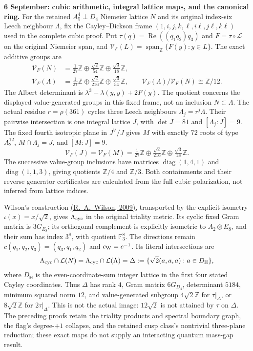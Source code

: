 \documentclass[10pt,letterpaper]{article}
\begin{document}
\noindent\textbf{6 September: cubic arithmetic, integral lattice maps, and the canonical ring.}
For the retained $A_5^4\perp D_4$ Niemeier lattice $N$ and its
original index-six Leech neighbour $\Lambda$, fix the Cayley--Dickson
frame $(1,i,j,k,\ell,i\ell,j\ell,k\ell)$ used in the complete cubic
proof. Put $\tau(q)=\operatorname{Re}((q_1q_2)q_3)$ and
$F=\tau\circ\mathcal L$ on the original Niemeier span,
and $\mathcal V_F(L)=\operatorname{span}_{\mathbb Z}\{F(y):y\in L\}$.
The exact additive groups are
\[
\begin{aligned}
 \mathcal V_F(N)&=\tfrac1{27}\mathbb Z\oplus
       \tfrac{\sqrt2}{54}\mathbb Z\oplus\tfrac{\sqrt3}{18}\mathbb Z,\\
 \mathcal V_F(\Lambda)&=\tfrac1{27}\mathbb Z\oplus
       \tfrac{\sqrt2}{216}\mathbb Z\oplus\tfrac{\sqrt3}{54}\mathbb Z,
 \qquad \mathcal V_F(\Lambda)/\mathcal V_F(N)\cong\mathbb Z/12.
\end{aligned}
\]
The Albert determinant is $\lambda^3-\lambda(y,y)+2F(y)$.
The quotient concerns the displayed value-generated groups in this fixed
frame, not an inclusion $N\subset\Lambda$. The actual residue
$r=\rho(361)$ cycles three Leech neighbours $\Lambda_j=r^j\Lambda$.
Their pairwise intersection is one integral lattice $J$, with
$\det J=81$ and $[\Lambda_j:J]=9$. The fixed fourth isotropic plane
in $J^\vee/J$ gives $M$ with exactly $72$ roots of type $A_2^{12}$,
$M\cap\Lambda_j=J$, and $[M:J]=9$.
\[
 \mathcal V_F(J)=\mathcal V_F(M)
 =\tfrac1{27}\mathbb Z\oplus\tfrac{\sqrt2}{216}\mathbb Z
                         \oplus\tfrac{\sqrt3}{18}\mathbb Z.
\]
The successive value-group inclusions have matrices
$\operatorname{diag}(1,4,1)$ and $\operatorname{diag}(1,1,3)$,
giving quotients $\mathbb Z/4$ and $\mathbb Z/3$.
Both containments and their reverse generator certificates are calculated
from the full cubic polarization, not inferred from lattice indices.

Wilson's construction \href{https://doi.org/10.1016/j.jalgebra.2009.03.021}{(R.~A.~Wilson, 2009)}, transported by the explicit
isometry $\iota(x)=x/\sqrt2$, gives $\Lambda_{\rm cyc}$ in the
original triality metric. Its cyclic fixed Gram matrix is $3G_{E_8}$;
its orthogonal complement is explicitly isometric to $A_2\otimes E_8$,
and their sum has index $3^8$, with quotient $\mathbb F_3^8$.
The directions remain $c(q_1,q_2,q_3)=(q_3,q_1,q_2)$ and
$c_{\rm W}=c^{-1}$. Its literal intersections are
\[
 \Lambda_{\rm cyc}\cap\mathcal L(N)
 =\Lambda_{\rm cyc}\cap\mathcal L(\Lambda)
 =\Delta:=\{\sqrt2(a,a,a):a\in D_{\mathbb H}\},
\]
where $D_{\mathbb H}$ is the even-coordinate-sum integer lattice in
the first four stated Cayley coordinates. Thus $\Delta$ has rank $4$,
Gram matrix $6G_{D_4}$, determinant $5184$, minimum squared norm $12$,
and value-generated subgroup $4\sqrt2\mathbb Z$ for $\tau|_\Delta$, or
$8\sqrt2\mathbb Z$ for $2\tau|_\Delta$. This is not the actual image:
$12\sqrt2$ is not attained by $\tau$ on $\Delta$.
The preceding proofs retain the triality products and spectral boundary
graph, the flag's degree-$+1$ collapse, and the retained cusp class's
nontrivial three-plane reduction; these exact maps do not supply an
interacting quantum mass-gap result.
\end{document}
